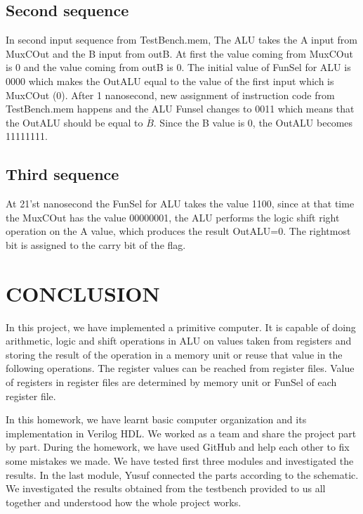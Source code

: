 \documentclass[pdftex,12pt,a4paper]{article}
\begin{document}
\subsection{Second sequence}
In second input sequence from TestBench.mem, The ALU takes the A input from MuxCOut and the B input from outB. At first the value 
coming from MuxCOut is 0 and the value coming
from outB is 0. The initial value of FunSel for ALU is 0000 which makes the OutALU equal to the value of the first input which is 
MuxCOut (0). After 1 nanosecond, new assignment of instruction code from TestBench.mem happens and 
the ALU Funsel changes to 0011 which means that the OutALU should be equal to $\overline{B}$. Since the B value
is 0, the OutALU becomes 11111111. 
\subsection{Third sequence}
At 21'st nanosecond the FunSel for ALU takes the value 1100, since at that time the MuxCOut has
the value 00000001, the ALU performs the logic shift right operation on the A value, which produces the result OutALU=0. The rightmost
bit is assigned to the carry bit of the flag.
\section{CONCLUSION}
In this project, we have implemented a primitive computer. It is capable of doing arithmetic, logic and shift operations in ALU on values taken from
registers and storing the result of the operation in a memory unit or reuse that value in the following operations. The register values can be 
reached from register files. Value of registers in register files are determined by memory unit or FunSel of each register file.

In this homework, we have learnt basic computer organization and its implementation in Verilog HDL. We worked as a team and share the project part by part.
During the homework, we have used GitHub and help each other to fix some mistakes we made. We have tested first three modules and investigated the results.
In the last module, Yusuf connected the parts according to the schematic. We investigated the results obtained from the testbench provided to us all together
and understood how the whole project works.
\end{document}
